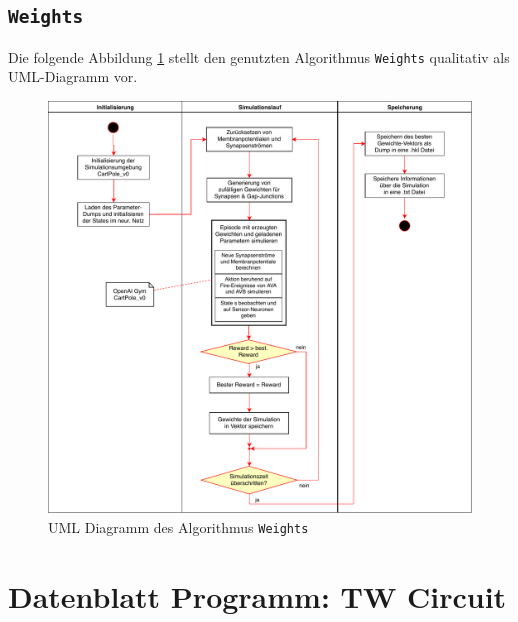 	\section{\texttt{Weights}}
	\label{app:UML_RS}
	Die folgende Abbildung \ref{fig:uml_weights} stellt den genutzten Algorithmus \texttt{Weights} qualitativ als UML-Diagramm vor.
	\begin{figure}[H]
		\centering
		\includegraphics[width=14cm]{figures/appendix/uml_w.pdf}
		\caption{UML Diagramm des Algorithmus \texttt{Weights}}
		\label{fig:uml_weights}
	\end{figure}
	
%
\chapter{Datenblatt Programm: TW Circuit}
%
\label{app:datenblatt}

